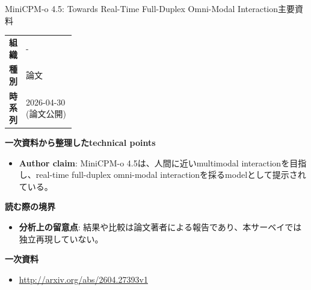 \begin{technicalnote}{MiniCPM-o 4.5: Towards Real-Time Full-Duplex Omni-Modal Interaction}{主要資料}
\begingroup
\begin{tabularx}{\linewidth}{@{}>{\bfseries}p{0.22\linewidth}X@{}}
組織 & - \\
種別 & 論文 \\
時系列 & 2026-04-30 (論文公開) \\
\end{tabularx}
\smallskip
{\bfseries 一次資料から整理したtechnical points}
\begin{itemize}[leftmargin=1.5em,itemsep=0.35em]
\item \textbf{Author claim}: MiniCPM-o 4.5は、人間に近いmultimodal interactionを目指し、real-time full-duplex omni-modal interactionを採るmodelとして提示されている。
\end{itemize}
\begin{minipage}{\linewidth}
{\bfseries 読む際の境界}
\begin{itemize}[leftmargin=1.5em,itemsep=0.35em]
\item \textbf{分析上の留意点}: 結果や比較は論文著者による報告であり、本サーベイでは独立再現していない。
\end{itemize}
\begin{samepage}
{\bfseries 一次資料}
\begingroup\sloppy
\begin{itemize}[leftmargin=1.5em,itemsep=0.25em]
\item {\scriptsize\url{http://arxiv.org/abs/2604.27393v1}}
\end{itemize}
\endgroup
\end{samepage}
\end{minipage}
\endgroup
\end{technicalnote}
\medskip

